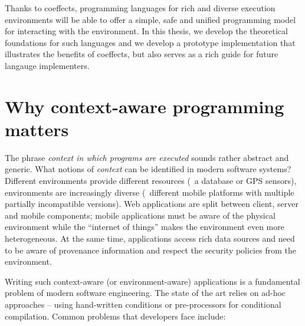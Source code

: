 Thanks to coeffects, programming languages for rich and diverse execution environments will
be able to offer a simple, safe and unified programming model for interacting with the 
environment. In this thesis, we develop the theoretical foundations for such languages and
we develop a prototype implementation that illustrates the benefits of coeffects, but also 
serves as a rich guide for future langauge implementers.



%
%                                                                                                                                                                       


\section{Why context-aware programming matters}
\label{sec:intro-whymatters}

The phrase \emph{context in which programs are executed} sounds rather abstract and generic.
What notions of \emph{context} can be identified in modern software systems?
Different environments provide different resources (\eg~a database or GPS sensors), environments
are increasingly diverse (\eg~different mobile platforms with multiple partially incompatible versions).
Web applications are split between client, server and mobile components; mobile
applications must be aware of the physical environment while the ``internet of things'' makes
the environment even more heterogeneous. At the same time, applications access
rich data sources and need to be aware of provenance information and respect the security policies
from the environment.

Writing such context-aware (or environment-aware) applications is a fundamental problem of modern
software engineering. The state of the art relies on ad-hoc approaches -- using hand-written conditions
or pre-processors for conditional compilation. Common problems that developers face include:

